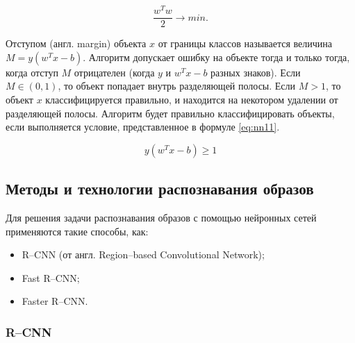 \begin{equation}
	\label{eq:nn10}
	\frac{w^Tw}{2} \rightarrow min.
\end{equation}

Отступом (англ. margin) объекта $x$ от границы классов называется величина $M=y(w^Tx-b)$. Алгоритм допускает ошибку на объекте тогда и только тогда, когда отступ $M$ отрицателен (когда $y$ и $w^Tx-b$ разных знаков). Если $M ∈ (0, 1)$, то объект попадает внутрь разделяющей полосы. Если $M > 1$, то объект $x$ классифицируется правильно, и находится на некотором удалении от разделяющей полосы. Алгоритм будет правильно классифицировать объекты, если выполняется условие, представленное в формуле \ref{eq:nn11}.

\begin{equation}
	\label{eq:nn11}
	y(w^Tx-b) \geq 1
\end{equation}

\subsection{Методы и технологии распознавания образов}

Для решения задачи распознавания образов с помощью нейронных сетей применяются такие способы, как:
\begin{itemize}[leftmargin=1.6\parindent]
	\item R--CNN (от англ. Region--based Convolutional Network);
	\item Fast R--CNN;
	\item Faster R--CNN. 
\end{itemize}

\subsubsection{R--CNN}

